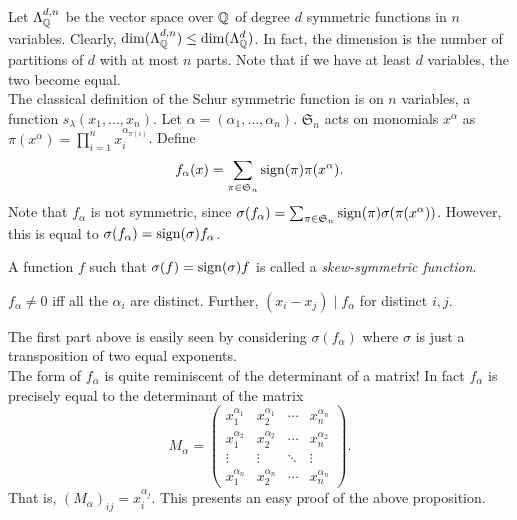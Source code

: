 	Let $\Lambda_{\mathbb{Q}}^{d,n}$ be the vector space over $\mathbb{Q}$ of degree $d$ symmetric functions in $n$ variables. Clearly, $\dim(\Lambda_{\mathbb{Q}}^{d,n}) \le \dim(\Lambda_{\mathbb{Q}}^{d})$. In fact, the dimension is the number of partitions of $d$ with at most $n$ parts. Note that if we have at least $d$ variables, the two become equal.\\
	The classical definition of the Schur symmetric function is on $n$ variables, a function $s_\lambda(x_1,\ldots,x_n)$. Let $\alpha = (\alpha_1,\ldots,\alpha_n)$. $\mathfrak{S}_n$ acts on monomials $x^{\alpha}$ as $\pi(x^\alpha) = \prod_{i=1}^n x_i^{\alpha_{\pi(i)}}$.
	Define
	\[ f_\alpha(x) = \sum_{\pi \in \mathfrak{S}_n} \operatorname{sign}(\pi) \pi(x^\alpha). \]
	Note that $f_\alpha$ is not symmetric, since $\sigma(f_\alpha) = \sum_{\pi \in \mathfrak{S}_n} \operatorname{sign}(\pi) \sigma(\pi(x^\alpha))$. However, this is equal to $\sigma(f_\alpha) = \operatorname{sign}(\sigma) f_\alpha$.

	\begin{fdef}
		A function $f$ such that $\sigma(f) = \operatorname{sign}(\sigma) f$ is called a \emph{skew-symmetric function}.
	\end{fdef}

	\begin{fprop}
		$f_\alpha \ne 0$ iff all the $\alpha_i$ are distinct. Further, $(x_i - x_j) \mid f_\alpha$ for distinct $i,j$.
	\end{fprop}
	The first part above is easily seen by considering $\sigma(f_\alpha)$ where $\sigma$ is just a transposition of two equal exponents.\\

	The form of $f_\alpha$ is quite reminiscent of the determinant of a matrix! In fact $f_\alpha$ is precisely equal to the determinant of the matrix
	\[ M_\alpha = \begin{pmatrix} x_1^{\alpha_1} & x_2^{\alpha_1} & \cdots & x_n^{\alpha_n} \\ x_1^{\alpha_2} & x_2^{\alpha_2} & \cdots & x_n^{\alpha_2} \\ \vdots & \vdots & \ddots & \vdots \\ x_1^{\alpha_n} & x_2^{\alpha_n} & \cdots & x_n^{\alpha_n} \end{pmatrix}. \]
	That is, $(M_\alpha)_{ij} = x_i^{\alpha_j}$. This presents an easy proof of the above proposition.\\

